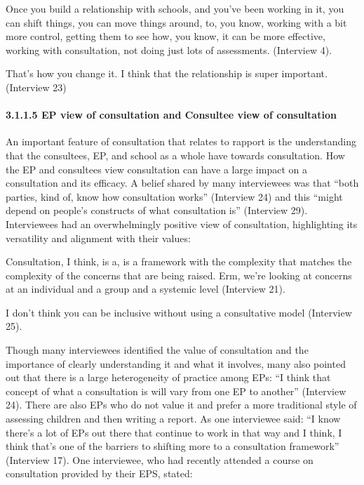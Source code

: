\documentclass[
]{article}
\begin{document}
Once you build a relationship with schools, and you've been working in
it, you can shift things, you can move things around, to, you know,
working with a bit more control, getting them to see how, you know, it
can be more effective, working with consultation, not doing just lots of
assessments. (Interview 4).

That's how you change it. I think that the relationship is super
important. (Interview 23)

\hypertarget{ep-view-of-consultation-and-consultee-view-of-consultation}{%
\paragraph{3.1.1.5 EP view of consultation and Consultee view of
consultation}\label{ep-view-of-consultation-and-consultee-view-of-consultation}}

An important feature of consultation that relates to rapport is the
understanding that the consultees, EP, and school as a whole have
towards consultation. How the EP and consultees view consultation can
have a large impact on a consultation and its efficacy. A belief shared
by many interviewees was that ``both parties, kind of, know how
consultation works'' (Interview 24) and this ``might depend on people's
constructs of what consultation is'' (Interview 29). Interviewees had an
overwhelmingly positive view of consultation, highlighting its
versatility and alignment with their values:

Consultation, I think, is a, is a framework with the complexity that
matches the complexity of the concerns that are being raised. Erm, we're
looking at concerns at an individual and a group and a systemic level
(Interview 21).

I don't think you can be inclusive without using a consultative model
(Interview 25).

Though many interviewees identified the value of consultation and the
importance of clearly understanding it and what it involves, many also
pointed out that there is a large heterogeneity of practice among EPs:
``I think that concept of what a consultation is will vary from one EP
to another'' (Interview 24). There are also EPs who do not value it and
prefer a more traditional style of assessing children and then writing a
report. As one interviewee said: ``I know there's a lot of EPs out there
that continue to work in that way and I think, I think that's one of the
barriers to shifting more to a consultation framework'' (Interview 17).
One interviewee, who had recently attended a course on consultation
provided by their EPS, stated:
\end{document}
